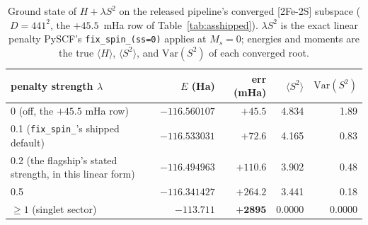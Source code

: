 \documentclass[11pt]{article}
\newcommand{\ssq}{\ensuremath{\langle S^2\rangle}}
\begin{document}
\begin{table}[ht]\centering\small
\caption{Ground state of $H + \lambda S^2$ on the released pipeline's converged [2Fe-2S] subspace ($D = 441^2$, the $+45.5$~mHa row of Table~\ref{tab:asshipped}). $\lambda S^2$ is the exact linear penalty PySCF's \texttt{fix\_spin\_(ss=0)} applies at $M_s = 0$; energies and moments are the true $\langle H\rangle$, \ssq, and $\mathrm{Var}(S^2)$ of each converged root.}
\label{tab:penalty}
\begin{tabular}{lrrrr}
\toprule
penalty strength $\lambda$ & $E$ (Ha) & err (mHa) & \ssq & $\mathrm{Var}(S^2)$ \\
\midrule
0 (off, the $+45.5$ mHa row) & $-116.560107$ & $+45.5$ & 4.834 & 1.89 \\
0.1 (\texttt{fix\_spin\_}'s shipped default) & $-116.533031$ & $+72.6$ & 4.165 & 0.83 \\
0.2 (the flagship's stated strength, in this linear form) & $-116.494963$ & $+110.6$ & 3.902 & 0.48 \\
0.5 & $-116.341427$ & $+264.2$ & 3.441 & 0.18 \\
$\geq 1$ (singlet sector) & $-113.711$ & $\mathbf{+2895}$ & $\mathbf{0.0000}$ & $\mathbf{0.0000}$ \\
\bottomrule
\end{tabular}
\end{table}
\end{document}
